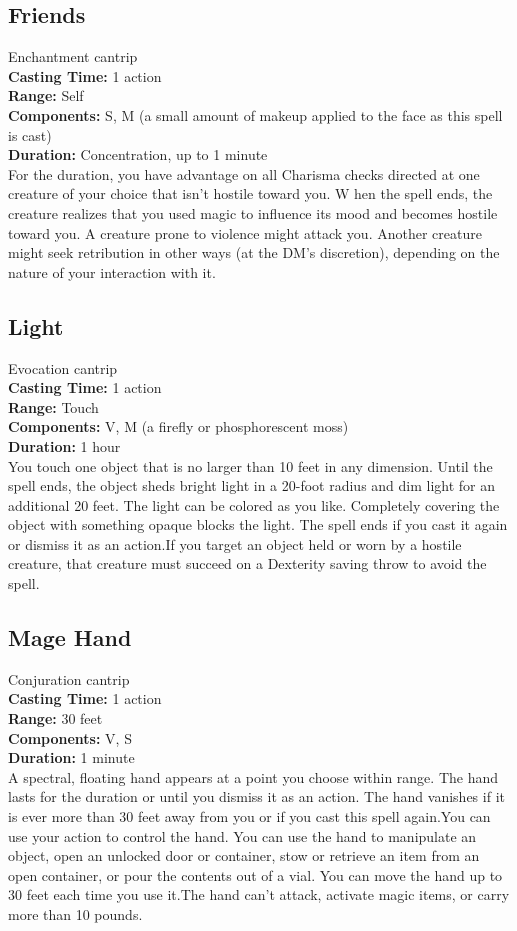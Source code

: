 \documentclass[11pt, A4paper, english]{article}
\begin{document}
		\subsection{Friends}
Enchantment cantrip \\
\textbf{Casting Time:} 1 action \\
\textbf{Range:} Self \\
\textbf{Components:} S, M (a small amount of makeup applied to the face as this spell is cast) \\
\textbf{Duration:} Concentration, up to  1  minute \\
For the duration, you have advantage on all Charisma checks directed at one creature of your choice that isn't hostile toward you. W hen the spell ends, the creature realizes that you used magic to influence its mood and becomes hostile toward you. A creature prone to violence might attack you. Another creature might seek retribution in other ways (at the DM’s discretion), depending on the nature of your interaction with it.

		\subsection{Light}
Evocation cantrip \\
\textbf{Casting Time:} 1 action \\
\textbf{Range:} Touch \\
\textbf{Components:} V, M (a firefly or phosphorescent moss) \\
\textbf{Duration:} 1 hour \\
You touch one object that is no larger than  10 feet in any dimension. Until the spell ends, the object sheds bright light in a 20-foot radius and dim light for an additional 20 feet. The light can be colored as you like. Completely covering the object with something opaque blocks the light. The spell ends if you cast it again or dismiss it as an action.If you target an object held or worn by a hostile creature, that creature must succeed on a Dexterity saving throw to avoid the spell.

		\subsection{Mage Hand}
Conjuration cantrip \\
\textbf{Casting Time:} 1 action \\
\textbf{Range:} 30 feet \\
\textbf{Components:} V, S \\
\textbf{Duration:} 1 minute \\
A spectral, floating hand appears at a point you choose within range. The hand lasts for the duration or until you dismiss it as an action. The hand vanishes if it is ever more than 30 feet away from you or if you cast this spell again.You can use your action to control the hand. You can use the hand to manipulate an object, open an unlocked door or container, stow or retrieve an item from an open container, or pour the contents out of a vial. You can move the hand up to 30 feet each time you use it.The hand can’t attack, activate magic items, or carry more than 10 pounds.
\end{document}
